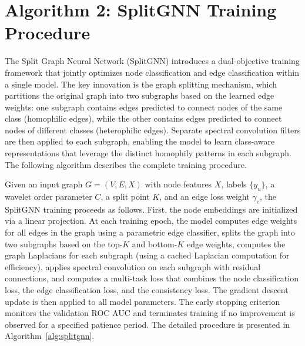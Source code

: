 \section{Algorithm 2: SplitGNN Training Procedure}
\label{app:splitgnn-algorithm}

The Split Graph Neural Network (SplitGNN) introduces a dual-objective training framework that jointly optimizes node classification and edge classification within a single model. The key innovation is the graph splitting mechanism, which partitions the original graph into two subgraphs based on the learned edge weights: one subgraph contains edges predicted to connect nodes of the same class (homophilic edges), while the other contains edges predicted to connect nodes of different classes (heterophilic edges). Separate spectral convolution filters are then applied to each subgraph, enabling the model to learn class-aware representations that leverage the distinct homophily patterns in each subgraph. The following algorithm describes the complete training procedure.

Given an input graph $G = (V, E, X)$ with node features $X$, labels $\{y_u\}$, a wavelet order parameter $C$, a split point $K$, and an edge loss weight $\gamma_e$, the SplitGNN training proceeds as follows. First, the node embeddings are initialized via a linear projection. At each training epoch, the model computes edge weights for all edges in the graph using a parametric edge classifier, splits the graph into two subgraphs based on the top-$K$ and bottom-$K$ edge weights, computes the graph Laplacians for each subgraph (using a cached Laplacian computation for efficiency), applies spectral convolution on each subgraph with residual connections, and computes a multi-task loss that combines the node classification loss, the edge classification loss, and the consistency loss. The gradient descent update is then applied to all model parameters. The early stopping criterion monitors the validation ROC AUC and terminates training if no improvement is observed for a specified patience period. The detailed procedure is presented in Algorithm~\ref{alg:splitgnn}.

